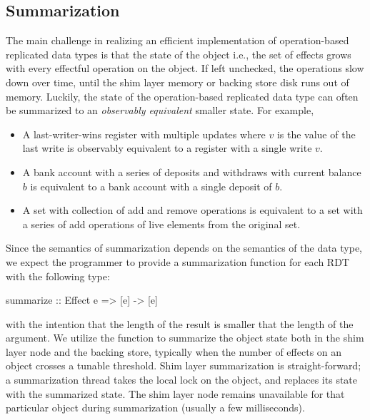 \subsection{Summarization}

The main challenge in realizing an efficient implementation of operation-based
replicated data types is that the state of the object i.e., the set of effects
grows with every effectful operation on the object. If left unchecked, the
operations slow down over time, until the shim layer memory or backing store
disk runs out of memory. Luckily, the state of the operation-based replicated
data type can often be summarized to an \emph{observably equivalent} smaller
state. For example,

\begin{itemize}
\setlength{\itemsep}{2pt}
\item A last-writer-wins register with multiple updates where $v$ is the value
of the last write is observably equivalent to a register with a single write
$v$.

\item A bank account with a series of deposits and withdraws with current
balance $b$ is equivalent to a bank account with a single deposit of $b$.

\item A set with collection of add and remove operations is equivalent to a set
with a series of add operations of live elements from the original set.
\end{itemize}

Since the semantics of summarization depends on the semantics of the data type,
we expect the programmer to provide a summarization function for each RDT with
the following type:

\begin{codehaskell}
summarize :: Effect e => [e] -> [e]
\end{codehaskell}

\noindent with the intention that the length of the result is smaller that the
length of the argument. We utilize the  function to summarize the
object state both in the shim layer node and the backing store, typically when
the number of effects on an object crosses a tunable threshold. Shim layer
summarization is straight-forward; a summarization thread takes the local lock
on the object, and replaces its state with the summarized state. The shim layer
node remains unavailable for that particular object during summarization
(usually a few milliseconds).

